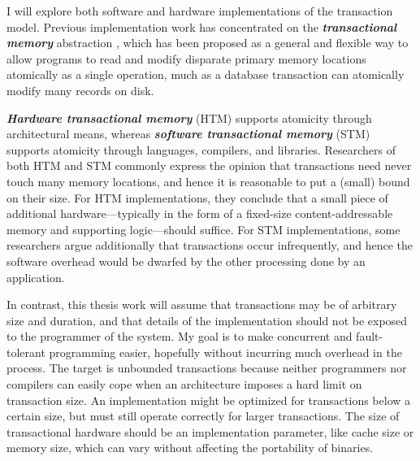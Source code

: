 \documentclass[12pt,twoside]{article}
\newcommand{\defn}[1]           {{\textit{\textbf{\boldmath #1}}}}
\begin{document}
I will explore both software and hardware implementations of the
transaction model.
Previous implementation work has concentrated on the
\defn{transactional memory} abstraction
\cite{Knight86,HerlihyMo93,StoneStHe93,RajwarGo02,ShavitTo95,HerlihyLuMoSc03},
which has
been proposed as a general and flexible way to allow programs to read
and modify disparate primary memory locations atomically as a single
operation, much as a database transaction can atomically modify many
records on disk.

\defn{Hardware transactional memory} (HTM) supports atomicity through
architectural means, whereas \defn{software transactional memory}
(STM) supports atomicity through languages, compilers, and libraries.
Researchers of both HTM and STM commonly express the opinion that
transactions need never touch many memory locations, and hence it is
reasonable to put a (small) bound on their size.  For HTM implementations,
they conclude that a small piece of additional hardware---typically in
the form of a fixed-size content-addressable memory and supporting
logic---should suffice.  For STM implementations, some researchers
argue additionally that transactions occur infrequently, and hence the
software overhead would be dwarfed by the other processing done by an
application.

In contrast, this thesis work will assume that transactions may be of
arbitrary size and duration, and that details of the implementation
should not be exposed to the programmer of the system.  My goal is to
make concurrent and fault-tolerant programming easier, hopefully
without incurring much overhead in the process.  The target is
unbounded transactions because neither programmers nor compilers can
easily cope when an architecture imposes a hard limit on transaction
size.  An implementation might be optimized for transactions below a
certain size, but must still operate correctly for larger
transactions.  The size of transactional hardware should be an
implementation parameter, like cache size or memory size, which can
vary without affecting the portability of binaries.
\end{document}
